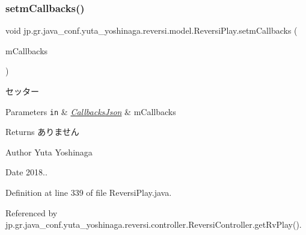 \subsubsection{\texorpdfstring{setm\+Callbacks()}{setmCallbacks()}}
{\footnotesize\ttfamily void jp.\+gr.\+java\+\_\+conf.\+yuta\+\_\+yoshinaga.\+reversi.\+model.\+Reversi\+Play.\+setm\+Callbacks (\begin{DoxyParamCaption}\item[{\hyperlink{classjp_1_1gr_1_1java__conf_1_1yuta__yoshinaga_1_1reversi_1_1model_1_1_callbacks_json}{Callbacks\+Json}}]{m\+Callbacks }\end{DoxyParamCaption})}



セッター 


\begin{DoxyParams}[1]{Parameters}
\mbox{\tt in}  & {\em \hyperlink{classjp_1_1gr_1_1java__conf_1_1yuta__yoshinaga_1_1reversi_1_1model_1_1_callbacks_json}{Callbacks\+Json}} & m\+Callbacks \\
\hline
\end{DoxyParams}
\begin{DoxyReturn}{Returns}
ありません 
\end{DoxyReturn}
\begin{DoxyAuthor}{Author}
Yuta Yoshinaga 
\end{DoxyAuthor}
\begin{DoxyDate}{Date}
2018.. 
\end{DoxyDate}


Definition at line 339 of file Reversi\+Play.\+java.



Referenced by jp.\+gr.\+java\+\_\+conf.\+yuta\+\_\+yoshinaga.\+reversi.\+controller.\+Reversi\+Controller.\+get\+Rv\+Play().

